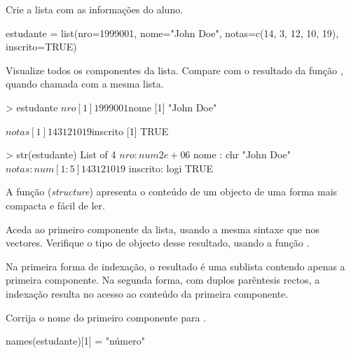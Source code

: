 \documentclass{exam}
\begin{document}
\begin{questions}
\question Crie a lista  com as informações do aluno.
\begin{solution}
	\begin{rcode}
		 estudante = list(nro=1999001, nome="John Doe", notas=c(14, 3, 12, 10, 19),
		   inscrito=TRUE)
	\end{rcode}
\end{solution}

\question Visualize todos os componentes da lista. Compare com o resultado da função , quando chamada com a mesma lista.
\begin{solution}
	\begin{rcode}
		> estudante
		$nro
		[1] 1999001
		
		$nome
		[1] "John Doe"
		
		$notas
		[1] 14  3 12 10 19
		
		$inscrito
		[1] TRUE
		
		> str(estudante)
		List of 4
		$ nro     : num 2e+06
		$ nome    : chr "John Doe"
		$ notas   : num [1:5] 14 3 12 10 19
		$ inscrito: logi TRUE
	\end{rcode}
	A função  (\textit{structure}) apresenta o conteúdo de um objecto de uma forma mais compacta e fácil de ler.
\end{solution}

\question Aceda ao primeiro componente da lista, usando a mesma sintaxe que nos vectores. Verifique o tipo de objecto desse resultado, usando a função .

\begin{solution}
	Na primeira forma de indexação, o resultado é uma sublista contendo apenas a primeira componente. Na segunda forma, com duplos parêntesis rectos, a indexação resulta no acesso ao conteúdo da primeira componente.
\end{solution}

\question Corrija o nome do primeiro componente para .

\begin{solution}
	\begin{rcode}
		names(estudante)[1] = "número"
	\end{rcode}
\end{solution}


\end{questions}
\end{document}
